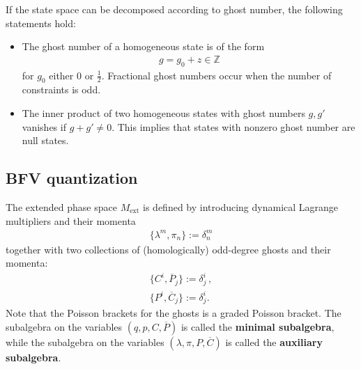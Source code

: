     \begin{property}
        If the state space can be decomposed according to ghost number, the following statements hold:
        \begin{itemize}
            \item The ghost number of a homogeneous state is of the form
                \begin{gather}
                    g = g_0 + z\in\mathbb{Z}
                \end{gather}
                for $g_0$ either $0$ or $\frac{1}{2}$. Fractional ghost numbers occur when the number of constraints is odd.
            \item The inner product of two homogeneous states with ghost numbers $g,g'$ vanishes if $g+g'\neq0$. This implies that states with nonzero ghost number are null states.
        \end{itemize}
    \end{property}


\subsection{BFV quantization}

    The extended phase space $M_\mathrm{ext}$ is defined by introducing dynamical Lagrange multipliers and their momenta
    \begin{gather}
        \{\lambda^m,\pi_n\} := \delta^m_n
    \end{gather}
    together with two collections of (homologically) odd-degree ghosts and their momenta:
    \begin{gather}
        \{C^i,\overline{P}_j\} := \delta^i_j\,,\\
        \{P^i,\overline{C}_j\} := \delta^i_j.
    \end{gather}
    Note that the Poisson brackets for the ghosts is a graded Poisson bracket. The subalgebra on the variables $(q,p,C,\overline{P})$ is called the \textbf{minimal subalgebra}, while the subalgebra on the variables $(\lambda,\pi,P,\overline{C})$ is called the \textbf{auxiliary subalgebra}.

